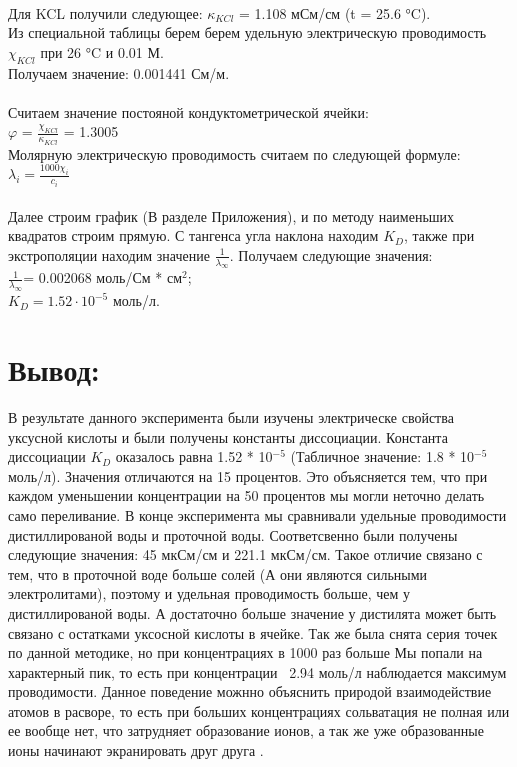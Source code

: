 \documentclass[a4paper,12pt]{article} %
\begin{document}
\paragraph{}
Для KCL получили следующее: $\kappa_{KCl} $ = 1.108 мСм/см (t = 25.6 °C).
\\Из специальной таблицы берем берем удельную электрическую проводимость $\chi_{KCl}$ при 26 °C и 0.01 М. 
\\ Получаем значение: 0.001441 См/м.

\paragraph{}
Считаем значение постояной кондуктометрической ячейки: 
\\$\varphi$ = $\frac{\chi_{KCl}}{\kappa_{KCl}}$ = 1.3005
\\Молярную электрическую проводимость считаем по следующей формуле: $\lambda_{i} = \frac{1000 \chi_{i}}{ c_i}$

\paragraph{}
Далее строим график (В разделе Приложения), и по методу наименьших квадратов строим прямую. С тангенса угла наклона находим $K_D$, также при экстрополяции находим значение $\frac{1}{\lambda_{\infty}}$. Получаем следующие значения:
\\ $\frac{1}{\lambda_{\infty}}$= 0.002068 моль/См * см$^2$;
\\ $K_D = 1.52 \cdot 10^{-5} $ моль/л. 
\section{Вывод:}
В результате данного эксперимента были изучены электрическе свойства уксусной кислоты и были получены константы диссоциации. 
Константа диссоциации $K_D$ оказалось равна 1.52 * 10$^{-5}$ (Табличное значение: 1.8 * 10$^{-5}$ моль/л). 
Значения отличаются на 15 процентов. 
Это объясняется тем, что при каждом уменьшении концентрации на 50 процентов мы могли неточно делать само переливание. 
В конце эксперимента мы сравнивали удельные проводимости дистиллированой воды и проточной воды. 
Соответсвенно были получены следующие значения: 45 мкСм/см и 221.1 мкСм/см. 
Такое отличие связано с тем, что в проточной воде больше солей (А они являются сильными электролитами), поэтому и удельная проводимость больше, чем у дистиллированой воды. 
А достаточно больше значение у дистилята может быть связано с остатками уксосной кислоты в ячейке.
Так же была снята серия точек по данной методике, но при концентрациях в 1000 раз больше
Мы попали на характерный пик, то есть при концентрации ~2.94 моль/л наблюдается максимум проводимости. 
Данное поведение можнно объяснить природой взаимодействие атомов в расворе, то есть при больших концентрациях сольватация не полная или ее вообще нет, что затрудняет образование ионов, а так же уже образованные ионы начинают экранировать друг друга .
\end{document}
